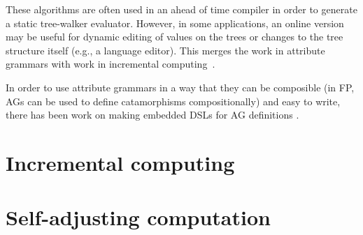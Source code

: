 \documentclass{article}
\theoremstyle{definition}
\newif\ifusenatbib
\begin{document}
These algorithms are often used in an ahead of time compiler in
order to generate a static tree-walker evaluator. However, in some
applications, an online version may be useful for dynamic editing
of values on the trees or changes to the tree structure itself
(e.g., a language editor). This merges the work in attribute
grammars with work in incremental
computing~\cite{reps1983incremental,ramalingam1993categorized}.

In order to use attribute grammars in a way that they can be
composible (in FP, AGs can be used to define catamorphisms
compositionally) and easy to write, there has been work on making
embedded DSLs for AG definitions \cite{sloane2010pure}.


\section{Incremental computing}

\section{Self-adjusting computation}


\ifusenatbib
	
\else
	\printbibliography
\fi
\end{document}
